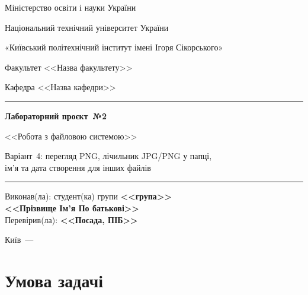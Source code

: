 \documentclass[12pt,a4paper]{article}
\begin{document}
\begin{titlepage}
  \centering
  \vspace*{1.5cm}
  {\Large Міністерство освіти і науки України\par}
  \vspace{0.3cm}
  {\Large Національний технічний університет України\par}
  {\Large «Київський політехнічний інститут імені Ігоря Сікорського»\par}

  \vspace{2cm}
  {\large Факультет <<Назва факультету>>\par}
  {\large Кафедра <<Назва кафедри>>\par}

  \vfill
  \rule{\linewidth}{0.8pt}\par
  \vspace{0.5cm}
  {\LARGE \bfseries Лабораторний проєкт~№2\par}
  \vspace{0.3cm}
  {\large <<Робота з файловою системою>>\par}
  \vspace{0.3cm}
  {\large Варіант~4: перегляд PNG, лічильник JPG/PNG у папці,\\
          ім'я та дата створення для інших файлів\par}
  \vspace{0.5cm}
  \rule{\linewidth}{0.8pt}\par
  \vfill

  \begin{flushright}\large
    Виконав(ла): студент(ка) групи \textbf{<<група>>}\\
    \textbf{<<Прізвище Ім'я По батькові>>}\\[0.8em]
    Перевірив(ла): \textbf{<<Посада, ПІБ>>}
  \end{flushright}

  \vfill
  {\large Київ~--- \the\year}
\end{titlepage}

\tableofcontents
\newpage

\section{Умова задачі}
\end{document}
